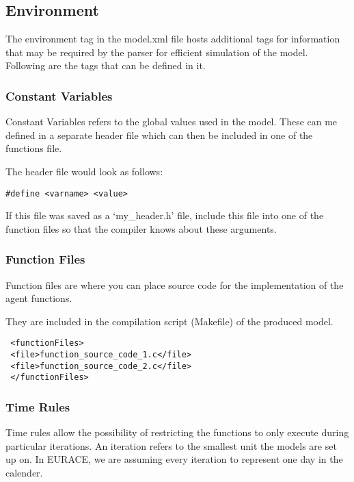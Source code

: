 \subsection{Environment}
The environment tag in the model.xml file hosts additional tags for information
that may be required by the parser for efficient simulation of the model.
Following are the tags that can be defined in it.


\subsubsection{Constant Variables}

Constant Variables refers to the global values used in the model. These can me
defined in a separate header file which can then be included in one of the
functions file.

The header file would look as follows:

\begin{mylisting}
\begin{verbatim}
#define <varname> <value>
\end{verbatim}
\end{mylisting}

If this file was saved as a `my\_header.h' file, include this file into one of
the function files so that the compiler knows about these arguments.

\subsubsection{Function Files}

Function files are where you can place source code for the implementation of the
agent functions.

They are included in the compilation script (Makefile) of the produced model.

\begin{mylisting}
\begin{verbatim}
 <functionFiles>
 <file>function_source_code_1.c</file>
 <file>function_source_code_2.c</file>
 </functionFiles>
\end{verbatim}
\end{mylisting}

\subsubsection{Time Rules}\label{timeunit}

Time rules allow the possibility of restricting the functions to
only execute during particular iterations. An iteration refers to
the smallest unit the models are set up on. In EURACE, we are
assuming every iteration to represent one day in the calender.

